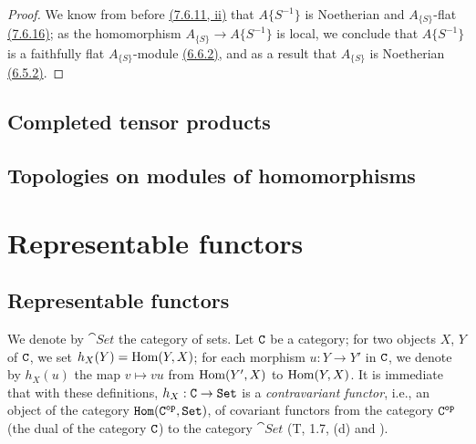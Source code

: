 \begin{proof}
\label{proof-cor-0.7.6.18}
We know from before \hyperref[prop-0.7.6.11]{(7.6.11, ii)} that $A\{S^{-1}\}$ is Noetherian and
$A_{\{S\}}$-flat \hyperref[prop-0.7.6.16]{(7.6.16)}; as the homomorphism $A_{\{S\}}\to A\{S^{-1}\}$
is local, we conclude that $A\{S^{-1}\}$ is a faithfully flat $A_{\{S\}}$-module
\hyperref[env-0.6.6.2]{(6.6.2)}, and as a result that $A_{\{S\}}$ is Noetherian
\hyperref[env-0.6.5.2]{(6.5.2)}.
\end{proof}

\subsection{Completed tensor products}
\label{subsection-completed-tensor-prods}

\subsection{Topologies on modules of homomorphisms}
\label{subsection-topologies-on-hom-modules}

\section{Representable functors}
\label{section-representable-functors}

\subsection{Representable functors}
\label{subsection-representable-functors}

\begin{env}[8.1.1]
\label{env-0.8.1.1}
We denote by $\cat{Set}$ the category of sets. Let $\mathtt{C}$ be a category; for two objects
$X$, $Y$ of $\mathtt{C}$, we set $h_X(Y)={\mathop{\mathrm{Hom}}\nolimits}(Y,X)$; for each morphism $u:Y\to Y'$ in $\mathtt{C}$, we
denote by $h_X(u)$ the map $v\mapsto vu$ from ${\mathop{\mathrm{Hom}}\nolimits}(Y',X)$ to ${\mathop{\mathrm{Hom}}\nolimits}(Y,X)$. It is immediate
that with these definitions, $h_X:\mathtt{C}\to\mathtt{Set}$ is a {\em contravariant functor}, i.e., an
object of the category $\mathtt{Hom}(\mathtt{C}^\mathtt{op},\mathtt{Set})$, of covariant functors from the
category $\mathtt{C}^\mathtt{op}$ (the dual of the category $\mathtt{C}$) to the category $\cat{Set}$ (T, 1.7, (d) and
).
\end{env}

